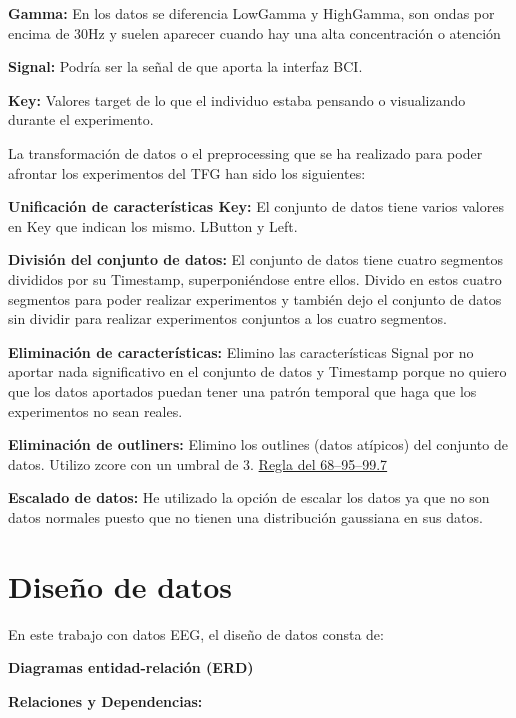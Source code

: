 \textbf{Gamma:} En los datos se diferencia LowGamma y HighGamma, son ondas por encima de 30Hz y suelen aparecer cuando hay una alta concentración o atención

\textbf{Signal:} Podría ser la señal de que aporta la interfaz BCI.

\textbf{Key:} Valores target de lo que el individuo estaba pensando o visualizando durante el experimento.


La transformación de datos o el preprocessing que se ha realizado para poder afrontar los experimentos del TFG han sido los siguientes:


\textbf{Unificación de características Key:} El conjunto de datos tiene varios valores en Key que indican los mismo. LButton y Left.


\textbf{División del conjunto de datos:} El conjunto de datos tiene cuatro segmentos divididos por su Timestamp, superponiéndose entre ellos. Divido en estos cuatro segmentos para poder realizar experimentos y también dejo el conjunto de datos sin dividir para realizar experimentos conjuntos a los cuatro segmentos.


\textbf{Eliminación de características:} Elimino las características Signal por no aportar nada significativo en el conjunto de datos y Timestamp porque no quiero que los datos aportados puedan tener una patrón temporal que haga que los experimentos no sean reales.

\textbf{Eliminación de outliners:} Elimino los outlines (datos atípicos) del conjunto de datos. Utilizo zcore con un umbral de 3. \href{https://en.wikipedia.org/wiki/68%E2%80%9395%E2%80%9399.7_rule}{Regla del 68–95–99.7}


\textbf{Escalado de datos:} He utilizado la opción de escalar los datos ya que no son datos normales puesto que no tienen una distribución gaussiana en sus datos. 

\section{Diseño de datos}

En este trabajo con datos EEG, el diseño de datos consta de:

\textbf{Diagramas entidad-relación (ERD)}

\textbf{Relaciones y Dependencias:}

